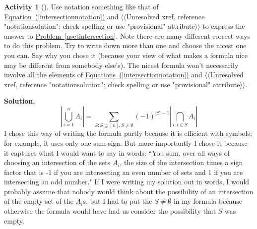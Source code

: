 \documentclass[10pt,]{book}
\theoremstyle{plain}
\theoremstyle{definition}
\newtheorem{activity}[project]{Activity}
\numberwithin{equation}{chapter}
\begin{document}
%
\begin{activity}[]\label{inclusion-exclusionunion}
Use notation something like that of \hyperref[intersectionnotation]{Equation~(\ref{intersectionnotation})} and {$\langle\langle$Unresolved xref, reference "notationsolution"; check spelling or use "provisional" attribute$\rangle\rangle$} to express the answer to \hyperref[nsetintersection]{Problem~\ref{nsetintersection}}. Note there are many different correct ways to do this problem. Try to write down more than one and choose the nicest one you can. Say why you chose it (because your view of what makes a formula nice may be different from somebody else's). The nicest formula won't necessarily involve all the elements of \hyperref[intersectionnotation]{Equations~(\ref{intersectionnotation})} and {$\langle\langle$Unresolved xref, reference "notationsolution"; check spelling or use "provisional" attribute$\rangle\rangle$}.%
\par\medskip\noindent%
\textbf{Solution.}\quad %
\begin{equation*}
\left|\bigcup_{i=1}^n A_i\right| = \sum_{S:S\subseteq [n],
S\not=\emptyset}(-1)^{|S|-1}|\bigcap_{i: i\in S}A_i|
\end{equation*}
I chose this way of writing the formula partly because it is efficient with symbols; for example, it uses only one sum sign. But more importantly I chose it because it captures what I would want to say in words: ``You sum, over all ways of choosing an intersection of the sets \(A_i\), the size of the intersection times a sign factor that is -1 if you are intersecting an even number of sets and 1 if you are intersecting an odd number." If I were writing my solution out in words, I would probably assume that nobody would think about the possibility of an intersection of the empty set of the \(A_i\)s, but I had to put the \(S\not=\emptyset\) in my formula because otherwise the formula would have had us consider the possibility that \(S\) was empty.%
\end{activity}
\end{document}

